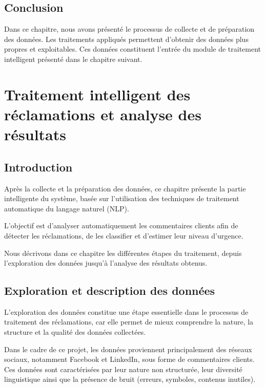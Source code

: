 \documentclass[12pt,a4paper,oneside]{report}
\begin{document}
\section{Conclusion}
Dans ce chapitre, nous avons présenté le processus de collecte et de préparation des données. Les traitements appliqués permettent d’obtenir des données plus propres et exploitables. Ces données constituent l’entrée du module de traitement intelligent présenté dans le chapitre suivant.

\chapter{Traitement intelligent des réclamations et analyse des résultats}

\section{Introduction}
Après la collecte et la préparation des données, ce chapitre présente la partie intelligente du système, basée sur l’utilisation des techniques de traitement automatique du langage naturel (NLP).

L’objectif est d’analyser automatiquement les commentaires clients afin de détecter les réclamations, de les classifier et d’estimer leur niveau d’urgence.

Nous décrivons dans ce chapitre les différentes étapes du traitement, depuis l’exploration des données jusqu’à l’analyse des résultats obtenus.

\section{Exploration et description des données}
L’exploration des données constitue une étape essentielle dans le processus de traitement des réclamations, car elle permet de mieux comprendre la nature, la structure et la qualité des données collectées.

Dans le cadre de ce projet, les données proviennent principalement des réseaux sociaux, notamment Facebook et LinkedIn, sous forme de commentaires clients. Ces données sont caractérisées par leur nature non structurée, leur diversité linguistique ainsi que la présence de bruit (erreurs, symboles, contenus inutiles).

\vspace{0.3cm}
\end{document}

